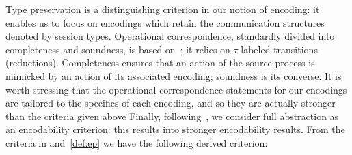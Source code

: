 \smallskip 

\noi Type preservation is a distinguishing criterion in our notion of encoding: it enables us to focus on encodings which retain the communication structures denoted by session types.
Operational correspondence, standardly divided into completeness and soundness, is based
on~\cite{DBLP:journals/iandc/Gorla10,DBLP:conf/icalp/LanesePSS10};
it relies on 
$\tau$-labeled transitions (reductions).
Completeness ensures that an action of the source process is mimicked
by an action of its associated encoding; soundness is its converse.
It is worth stressing that 
the operational correspondence statements 
for our encodings 
 are tailored to the specifics of each encoding, and so they
 are actually stronger than the criteria given above
Finally, following~\cite{SangiorgiD:expmpa,DBLP:conf/lics/PalamidessiSVV06,Yoshida96},
we consider full abstraction as an encodability criterion: this results into 
stronger encodability results. 
From the criteria in  and~\ref{def:ep}
we have the following derived criterion: 

%

